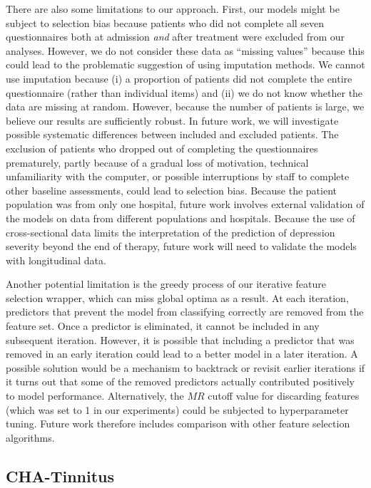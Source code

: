 \documentclass[
  oneside]{book}
\begin{document}
There are also some limitations to our approach.
First, our models might be subject to selection bias because patients who did not complete all seven questionnaires both at admission \emph{and} after treatment were excluded from our analyses.
However, we do not consider these data as ``missing values'' because this could lead to the problematic suggestion of using imputation methods.
We cannot use imputation because (i) a proportion of patients did not complete the entire questionnaire (rather than individual items) and (ii) we do not know whether the data are missing at random.
However, because the number of patients is large, we believe our results are sufficiently robust.
In future work, we will investigate possible systematic differences between included and excluded patients.
The exclusion of patients who dropped out of completing the questionnaires prematurely, partly because of a gradual loss of motivation, technical unfamiliarity with the computer, or possible interruptions by staff to complete other baseline assessments, could lead to selection bias.
Because the patient population was from only one hospital, future work involves external validation of the models on data from different populations and hospitals.
Because the use of cross-sectional data limits the interpretation of the prediction of depression severity beyond the end of therapy, future work will need to validate the models with longitudinal data.

Another potential limitation is the greedy process of our iterative feature selection wrapper, which can miss global optima as a result.
At each iteration, predictors that prevent the model from classifying correctly are removed from the feature set.
Once a predictor is eliminated, it cannot be included in any subsequent iteration.
However, it is possible that including a predictor that was removed in an early iteration could lead to a better model in a later iteration.
A possible solution would be a mechanism to backtrack or revisit earlier iterations if it turns out that some of the removed predictors actually contributed positively to model performance.
Alternatively, the \(MR\) cutoff value for discarding features (which was set to 1 in our experiments) could be subjected to hyperparameter tuning.
Future work therefore includes comparison with other feature selection algorithms.

\hypertarget{iml-discussion-tinnitus}{%
\subsection{CHA-Tinnitus}\label{iml-discussion-tinnitus}}
\end{document}
